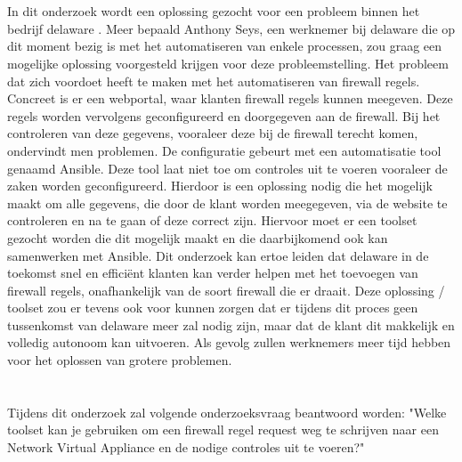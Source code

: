 \section{}%
\label{sec:probleemstelling}
In dit onderzoek wordt een oplossing gezocht voor een probleem binnen het bedrijf delaware . Meer bepaald Anthony Seys, een werknemer bij delaware die op dit moment bezig is met het automatiseren van enkele processen, zou graag een mogelijke oplossing voorgesteld krijgen voor deze probleemstelling. Het probleem dat zich voordoet heeft te maken met het automatiseren van firewall regels. Concreet is er een webportal, waar klanten firewall regels kunnen meegeven. Deze regels worden vervolgens geconfigureerd en doorgegeven aan de firewall. Bij het controleren van deze gegevens, vooraleer deze bij de firewall terecht komen, ondervindt men problemen. De configuratie gebeurt met een automatisatie tool genaamd Ansible. Deze tool laat niet toe om controles uit te voeren vooraleer de zaken worden geconfigureerd. Hierdoor is een oplossing nodig die het mogelijk maakt om alle gegevens, die door de klant worden meegegeven, via de website te controleren en na te gaan of deze correct zijn. Hiervoor moet er een toolset gezocht worden die dit mogelijk maakt en die daarbijkomend ook kan samenwerken met Ansible. Dit onderzoek kan ertoe leiden dat delaware in de toekomst snel en efficiënt klanten kan verder helpen met het toevoegen van firewall regels, onafhankelijk van de soort firewall die er draait. Deze oplossing / toolset zou er tevens ook voor kunnen zorgen dat er tijdens dit proces geen tussenkomst van delaware meer zal nodig zijn, maar dat de klant dit makkelijk en volledig autonoom kan uitvoeren. Als gevolg zullen  werknemers meer tijd hebben voor het oplossen van grotere problemen. \newline




\section{}%
\label{sec:onderzoeksvraag-TODO}
Tijdens dit onderzoek zal volgende onderzoeksvraag beantwoord worden: "Welke toolset kan je gebruiken om een firewall regel request weg te schrijven naar een Network Virtual Appliance en de nodige controles uit te voeren?"
